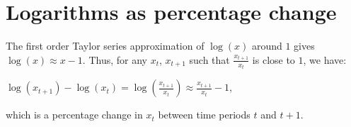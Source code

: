 \chapter{Logarithms as percentage change}
\label{appb}

The first order Taylor series approximation of $\log(x)$ around $1$ gives $\log(x) \approx x - 1$. Thus, for any $x_t$, $x_{t+1}$ such that $\frac{x_{t+1}}{x_t}$ is close to $1$, we have:

\begin{center}
	$\log(x_{t+1}) - \log(x_t) = \log(\frac{x_{t+1}}{x_t}) \approx \frac{x_{t+1}}{x_t} - 1$,
\end{center}

which is a percentage change in $x_t$ between time periods $t$ and $t+1$.
